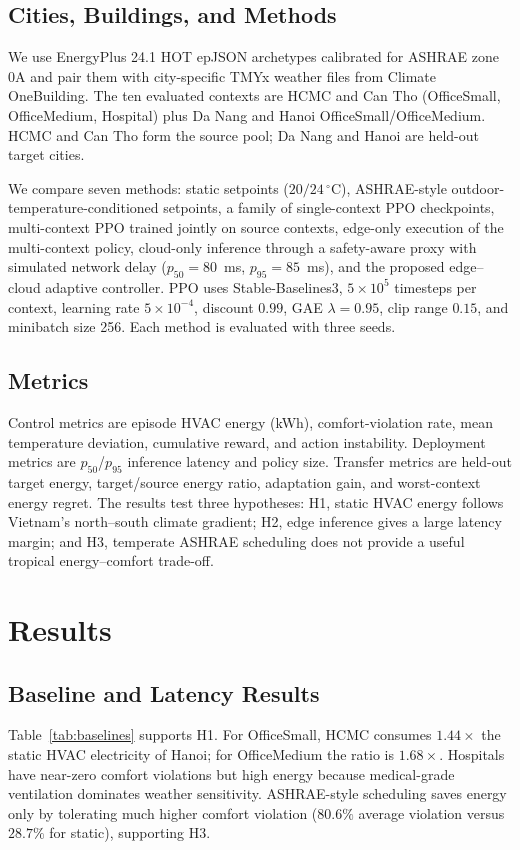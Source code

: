 \documentclass[runningheads,a4paper]{llncs}
\begin{document}
\subsection{Cities, Buildings, and Methods}
We use EnergyPlus 24.1 HOT epJSON archetypes calibrated for ASHRAE zone 0A and pair them with city-specific TMYx weather files from Climate OneBuilding\cite{doe2024epw}. The ten evaluated contexts are HCMC and Can Tho (OfficeSmall, OfficeMedium, Hospital) plus Da Nang and Hanoi OfficeSmall/\allowbreak OfficeMedium. HCMC and Can Tho form the source pool; Da Nang and Hanoi are held-out target cities.

We compare seven methods: static setpoints ($20/24\,^\circ\mathrm{C}$), ASHRAE-style outdoor-temperature-conditioned setpoints, a family of single-context PPO checkpoints, multi-context PPO trained jointly on source contexts, edge-only execution of the multi-context policy, cloud-only inference through a safety-aware proxy with simulated network delay ($p_{50}=80$~ms, $p_{95}=85$~ms), and the proposed edge--cloud adaptive controller. PPO uses Stable-Baselines3\allowbreak\cite{stable_baselines3}, $5\times10^5$ timesteps per context, learning rate $5\times10^{-4}$, discount $0.99$, GAE $\lambda=0.95$, clip range $0.15$, and minibatch size 256. Each method is evaluated with three seeds.

\subsection{Metrics}
Control metrics are episode HVAC energy (kWh), comfort-violation rate, mean temperature deviation, cumulative reward, and action instability. Deployment metrics are $p_{50}$/$p_{95}$ inference latency and policy size. Transfer metrics are held-out target energy, target/source energy ratio, adaptation gain, and worst-context energy regret. The results test three hypotheses: H1, static HVAC energy follows Vietnam's north--south climate gradient; H2, edge inference gives a large latency margin; and H3, temperate ASHRAE scheduling does not provide a useful tropical energy--comfort trade-off.

\section{Results}
\subsection{Baseline and Latency Results}
Table~\ref{tab:baselines} supports H1. For OfficeSmall, HCMC consumes $1.44\times$ the static HVAC electricity of Hanoi; for OfficeMedium the ratio is $1.68\times$. Hospitals have near-zero comfort violations but high energy because medical-grade ventilation dominates weather sensitivity. ASHRAE-style scheduling saves energy only by tolerating much higher comfort violation ($80.6\%$ average violation versus $28.7\%$ for static), supporting H3.
\end{document}
